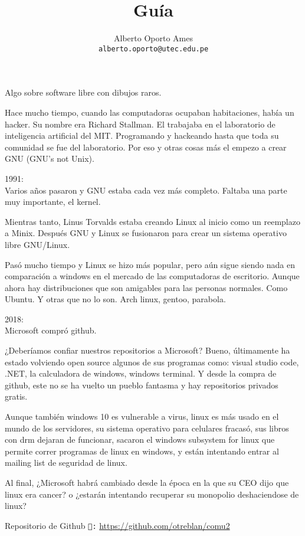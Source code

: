 \documentclass[12pt]{article}
\title{\textbf{Guía}}
\author{
		Alberto Oporto Ames\\
		\texttt{alberto.oporto@utec.edu.pe}
		}
\begin{document}
\maketitle
\thispagestyle{fancy}

Algo sobre software libre con dibujos raros.

Hace mucho tiempo, cuando las computadoras ocupaban habitaciones, había un hacker.
Su nombre era Richard Stallman.
El trabajaba en el laboratorio de inteligencia artificial del MIT.
Programando y hackeando hasta que toda su comunidad se fue del laboratorio.
Por eso y otras cosas más el empezo a crear GNU (GNU's not Unix).

1991:\\
Varios años pasaron y GNU estaba cada vez más completo.
Faltaba una parte muy importante, el kernel.

Mientras tanto, Linus Torvalds estaba creando Linux al inicio como un reemplazo a Minix.
Después GNU y Linux se fusionaron para crear un sistema operativo libre GNU/Linux.

Pasó mucho tiempo y Linux se hizo más popular,
pero aún sigue siendo nada en comparación a windows en el mercado de las computadoras de escritorio.
Aunque ahora hay distribuciones que son amigables para las personas normales.
Como Ubuntu.
Y otras que no lo son.
Arch linux, gentoo, parabola.

2018:\\
Microsoft compró github.

¿Deberíamos confiar nuestros repositorios a Microsoft?
Bueno, últimamente ha estado volviendo open source algunos de sus programas como: visual studio code, .NET, la calculadora de windows, windows terminal.
Y desde la compra de github, este no se ha vuelto un pueblo fantasma y hay repositorios privados gratis.

Aunque también windows 10 es vulnerable a virus,
linux es más usado en el mundo de los servidores,
su sistema operativo para celulares fracasó,
sus libros con drm dejaran de funcionar,
sacaron el windows subsystem for linux que permite correr programas de linux en windows,
y están intentando entrar al mailing list de seguridad de linux.

Al final, ¿Microsoft habrá cambiado desde la época en la que su CEO dijo que linux era cancer?
o ¿estarán intentando recuperar su monopolio deshaciendose de linux?

\vfill
Repositorio de Github \texttt{:} \url{https://github.com/otreblan/comu2}
\end{document}
